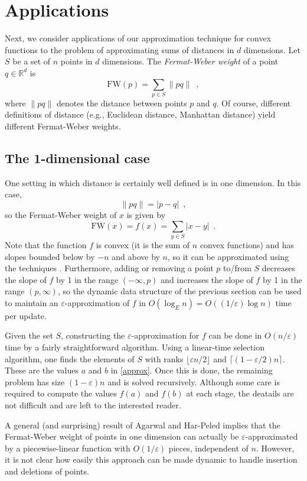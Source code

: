 \documentclass[charterfonts,lotsofwhite]{patmorin}
\newcommand{\fw}{\mathrm{FW}}
\newcommand{\eps}{\varepsilon}
\newcommand{\Real}{\mathbb{R}}
\begin{document}
\section{Applications}

Next, we consider applications of our approximation technique for
convex functions to the problem of approximating sums of distances in
$d$ dimensions.  Let $S$ be a set of $n$ points in $d$ dimensions.
The \emph{Fermat-Weber weight} of a point $q\in\Real^d$ is
\[
   \fw(p) = \sum_{p\in S} \|pq\| \enspace ,
\]
where $\|pq\|$ denotes the distance between points $p$ and $q$. Of
course, different definitions of distance (e.g., Euclidean distance,
Manhattan distance) yield different Fermat-Weber weights.

\subsection{The 1-dimensional case}

One setting in which distance is certainly well defined is in one
dimension.  In this case,
\[ 
\|pq\| = |p-q| \enspace ,
\]
so the Fermat-Weber weight of $x$ is given by
\[
   \fw(x) = f(x) = \sum_{y\in S} |x-y|  \enspace .
\]
Note that the function $f$ is convex (it is the sum of $n$ convex
functions) and has slopes bounded below by $-n$ and above by $n$, so
it can be approximated using the techniques .  Furthermore,
adding or removing a point $p$ to/from $S$ decreases the slope of $f$
by 1 in the range $(-\infty,p)$ and increases the slope of $f$ by 1 in
the range $(p,\infty)$, so the dynamic data structure of the previous
section can be used to maintain an $\eps$-approximation of $f$ in
$O(\log_E n)= O((1/\eps) \log n)$ time per update.

Given the set $S$, constructing the $\eps$-approximation for $f$
can be done in $O(n/\eps)$ time by a fairly straightforward
algorithm.  Using a linear-time selection algorithm, one finds the
elements of $S$ with ranks $\lfloor\eps n/2\rfloor$ and
$\lceil(1-\eps/2) n\rceil$.  These are the values $a$ and $b$ in
\eqref{approx}.  Once this is done, the remaining problem has size
$(1-\eps) n$ and is solved recursively.  Although some care is
required to compute the values $f(a)$ and $f(b)$ at each stage, the
deatails are not difficult and are left to the interested reader.

\begin{rem} 
A general (and surprising) result of Agarwal and Har-Peled \cite{ah01}
implies that the Fermat-Weber weight of points in one dimension can
actually be $\eps$-approximated by a piecewise-linear function with
$O(1/\eps)$ pieces, independent of $n$.  However, it is not clear how 
easily this approach
can be made dynamic to handle insertion and deletions of points.
\end{rem}
\end{document}
